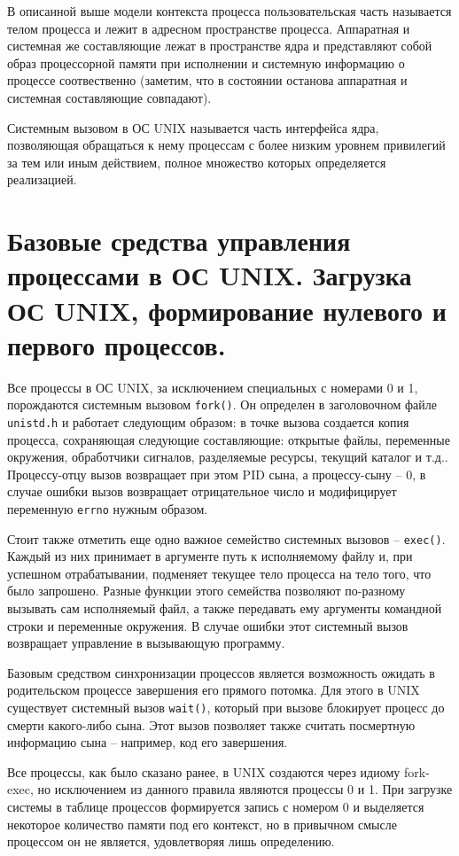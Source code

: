 \documentclass[a4paper,12pt,titlepage,finall]{article}
\begin{document}
В описанной выше модели контекста процесса пользовательская часть называется телом процесса и лежит в адресном пространстве процесса. Аппаратная и системная же составляющие лежат в пространстве ядра и представляют собой образ процессорной памяти при исполнении и системную информацию о процессе соотвественно (заметим, что в состоянии останова аппаратная и системная составляющие совпадают).



Системным вызовом в ОС UNIX называется часть интерфейса ядра, позволяющая обращаться к нему процессам с более низким уровнем привилегий за тем или иным действием, полное множество которых определяется реализацией.

\section{Базовые средства управления процессами в ОС UNIX. Загрузка
ОС UNIX, формирование нулевого и первого процессов.}
Все процессы в ОС UNIX, за исключением специальных с номерами 0 и 1, порождаются системным вызовом \texttt{fork()}. Он определен в заголовочном файле \texttt{unistd.h} и работает следующим образом: в точке вызова создается копия процесса, сохраняющая следующие составляющие: открытые файлы, переменные окружения, обработчики сигналов, разделяемые ресурсы, текущий каталог и т.д.. Процессу-отцу вызов возвращает при этом PID сына, а процессу-сыну -- 0, в случае ошибки вызов возвращает отрицательное число и модифицирует переменную \texttt{errno} нужным образом.

Стоит также отметить еще одно важное семейство системных вызовов -- \texttt{exec()}. Каждый из них принимает в аргументе путь к исполняемому файлу и, при успешном отрабатывании, подменяет текущее тело процесса на тело того, что было запрошено. Разные функции этого семейства позволяют по-разному вызывать сам исполняемый файл, а также передавать ему аргументы командной строки и переменные окружения. В случае ошибки этот системный вызов возвращает управление в вызывающую программу.

Базовым средством синхронизации процессов является возможность ожидать в родительском процессе завершения его прямого потомка. Для этого в UNIX существует системный вызов \texttt{wait()}, который при вызове блокирует процесс до смерти какого-либо сына. Этот вызов позволяет также считать посмертную информацию сына -- например, код его завершения.

Все процессы, как было сказано ранее, в UNIX создаются через идиому fork-exec, но исключением из данного правила являются процессы 0 и 1. При загрузке системы в таблице процессов формируется запись с номером 0 и выделяется некоторое количество памяти под его контекст, но в привычном смысле процессом он не является, удовлетворяя лишь определению.
\end{document}
